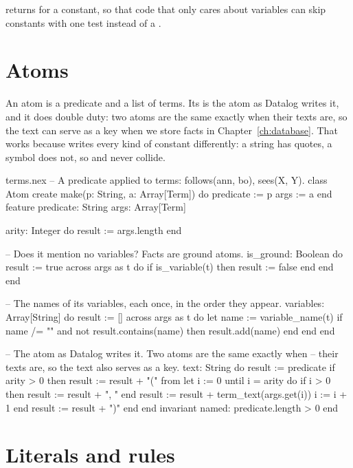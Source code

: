  returns  for a constant, so that code that
only cares about variables can skip constants with one test instead of a
.

\section{Atoms}

An atom is a predicate and a list of terms. Its  is the atom as
Datalog writes it, and it does double duty: two atoms are the same exactly
when their texts are, so the text can serve as a key when we store facts
in Chapter~\ref{ch:database}. That works because  writes
every kind of constant differently: a string has quotes, a symbol does not,
so  and  never collide.

\begin{continued}{terms.nex}
-- A predicate applied to terms: follows(ann, bo), sees(X, Y).
class Atom
create
  make(p: String, a: Array[Term])
  do
    predicate := p
    args := a
  end
feature
  predicate: String
  args: Array[Term]

  arity: Integer
  do
    result := args.length
  end

  -- Does it mention no variables? Facts are ground atoms.
  is_ground: Boolean
  do
    result := true
    across args as t do
      if is_variable(t) then
        result := false
      end
    end
  end

  -- The names of its variables, each once, in the order they appear.
  variables: Array[String]
  do
    result := []
    across args as t do
      let name := variable_name(t)
      if name /= "" and not result.contains(name) then
        result.add(name)
      end
    end
  end

  -- The atom as Datalog writes it. Two atoms are the same exactly when
  -- their texts are, so the text also serves as a key.
  text: String
  do
    result := predicate
    if arity > 0 then
      result := result + "("
      from let i := 0 until i = arity do
        if i > 0 then
          result := result + ", "
        end
        result := result + term_text(args.get(i))
        i := i + 1
      end
      result := result + ")"
    end
  end
invariant
  named: predicate.length > 0
end
\end{continued}

\section{Literals and rules}


